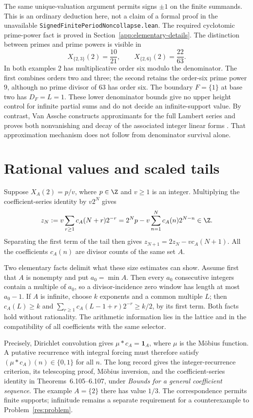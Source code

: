 \documentclass[11pt]{article}
\begin{document}
The same unique-valuation argument permits signs $\pm1$ on the finite
summands.  This is an ordinary deduction here, not a claim of a formal
proof in the unavailable \texttt{SignedFinitePeriodNoncollapse.lean}.
The required cyclotomic prime-power fact is proved in
Section~\ref{app:elementary-details}.
The distinction between primes and prime powers is visible in
\[
 X_{\{2,3\}}(2)=\frac{10}{21},\qquad
 X_{\{2,6\}}(2)=\frac{22}{63}.
\]
In both examples $2$ has multiplicative order six modulo the denominator.
The first combines orders two and three; the second retains the
order-six prime power $9$, although no prime divisor of $63$ has order six.
The boundary $F=\{1\}$ at base two has $D_F=L=1$.
These lower denominator bounds give no upper height control for infinite
partial sums and do not decide an infinite-support value.  By contrast,
Van Assche constructs approximants for the full Lambert series and proves
both nonvanishing and decay of the associated integer linear forms
\cite[Lemma~1 and (34)--(35)]{vanassche2001}.  That approximation mechanism
does not follow from denominator survival alone.

\section{Rational values and scaled tails}\label{sec:forced}
Suppose $X_A(2)=p/v$, where $p\in\Z$ and $v\ge1$ is an integer.
Multiplying the coefficient-series identity by $v2^N$ gives
\[
 z_N:=v\sum_{r\ge1}c_A(N+r)2^{-r}
     =2^Np-v\sum_{n=1}^{N}c_A(n)2^{N-n}\in\Z.
\]
Separating the first term of the tail then gives
$z_{N+1}=2z_N-vc_A(N+1)$.
All the coefficients $c_A(n)$ are divisor counts of the same set $A$.

Two elementary facts delimit what these size estimates can show.
Assume first that $A$ is nonempty and put $a_0=\min A$.  Then every $a_0$ consecutive integers contain a multiple
of $a_0$, so a divisor-incidence zero window has length at most $a_0-1$.
If $A$ is infinite, choose $k$ exponents and a common multiple $L$;
then $c_A(L)\ge k$ and
$\sum_{r\ge1}c_A(L-1+r)2^{-r}\ge k/2$, by its first term.
Both facts hold without rationality.  The arithmetic information lies in
the lattice and in the compatibility of all coefficients with the same
selector.

Precisely, Dirichlet convolution gives
$\mu*c_A=\mathbf1_A$, where $\mu$ is the M\"obius function.
A putative recurrence with integral forcing must therefore satisfy
$(\mu*c_A)(n)\in\{0,1\}$ for all $n$.
The long record gives the integer-recurrence criterion, its telescoping
proof, M\"obius inversion, and the coefficient-series identity in
Theorems~6.105--6.107, under \emph{Bounds for a general coefficient
sequence}.  The example $A=\{2\}$ there has value $1/3$.
The correspondence permits finite supports; infinitude remains a separate
requirement for a counterexample to Problem~\ref{res:problem}.
\end{document}
